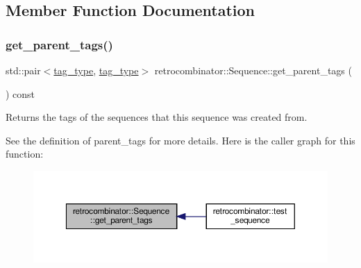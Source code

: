 \subsection{Member Function Documentation}
\mbox{\label{classretrocombinator_1_1Sequence_abd985b5164277d63c40f9580882335c8}} 
\subsubsection{\texorpdfstring{get\+\_\+parent\+\_\+tags()}{get\_parent\_tags()}}
{\footnotesize\ttfamily std\+::pair$<$\hyperlink{namespaceretrocombinator_afd7c6eb4293e8c4d12827609a9a34b9b}{tag\+\_\+type}, \hyperlink{namespaceretrocombinator_afd7c6eb4293e8c4d12827609a9a34b9b}{tag\+\_\+type}$>$ retrocombinator\+::\+Sequence\+::get\+\_\+parent\+\_\+tags (\begin{DoxyParamCaption}{ }\end{DoxyParamCaption}) const\hspace{0.3cm}{\ttfamily [inline]}}



Returns the tags of the sequences that this sequence was created from. 

See the definition of parent\+\_\+tags for more details. Here is the caller graph for this function\+:
\nopagebreak
\begin{figure}[H]
\begin{center}
\leavevmode
\includegraphics[width=350pt]{classretrocombinator_1_1Sequence_abd985b5164277d63c40f9580882335c8_icgraph}
\end{center}
\end{figure}
\mbox{\label{classretrocombinator_1_1Sequence_a445120376c2e5c626d3ecfa509406843}} 
